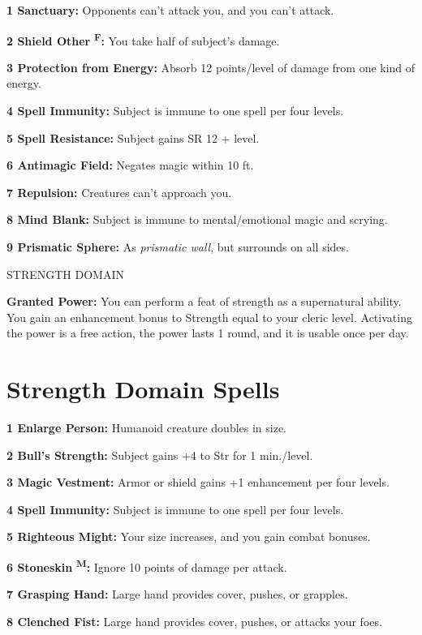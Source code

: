 \documentclass{article}
\begin{document}
\textbf{1 Sanctuary:} Opponents can't attack you, and you can't attack.

\textbf{2 Shield Other }\textsuperscript{\textbf{F}}\textbf{: }You take half of 
subject's damage.

\textbf{3 Protection from Energy: }Absorb 12 points/level of damage from one kind 
of energy.

\textbf{4 Spell Immunity:} Subject is immune to one spell per four levels.

\textbf{5 Spell Resistance: }Subject gains SR 12 + level.

\textbf{6 Antimagic Field: }Negates magic within 10 ft.

\textbf{7 Repulsion: }Creatures can't approach you.

\textbf{8 Mind Blank:} Subject is immune to mental/emotional magic and scrying.

\textbf{9 Prismatic Sphere: }As \textit{prismatic wall}, but surrounds on all sides.

\vspace{12pt}
STRENGTH DOMAIN

\textbf{Granted Power:} You can perform a feat of strength as a supernatural ability. 
You gain an enhancement bonus to Strength equal to your cleric level. Activating 
the power is a free action, the power lasts 1 round, and it is usable once per 
day.

\section*{\textbf{Strength Domain Spells}}

\textbf{1 Enlarge Person:} Humanoid creature doubles in size.

\textbf{2 Bull's Strength: }Subject gains +4 to Str for 1 min./level.

\textbf{3 Magic Vestment: }Armor or shield gains +1 enhancement per four levels.

\textbf{4 Spell Immunity:} Subject is immune to one spell per four levels.

\textbf{5 Righteous Might: }Your size increases, and you gain combat bonuses.

\textbf{6 Stoneskin }\textsuperscript{\textbf{M}}\textbf{: }Ignore 10 points of 
damage per attack.

\textbf{7 Grasping Hand: }Large hand provides cover, pushes, or grapples.

\textbf{8 Clenched Fist: }Large hand provides cover, pushes, or attacks your foes.
\end{document}
